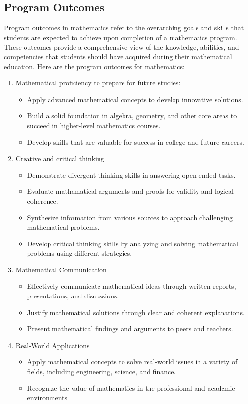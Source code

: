 \subsection{Program Outcomes}
Program outcomes in mathematics refer to the overarching goals and skills that students are expected to achieve upon completion of a mathematics program. These outcomes provide a comprehensive view of the knowledge, abilities, and competencies that students should have acquired during their mathematical education. Here are the program outcomes for mathematics: 
\begin{enumerate}[label=\Alph*.]
	\item{Mathematical proficiency to prepare for future studies:}
	\begin{itemize}
		\item Apply advanced mathematical concepts to develop innovative solutions.
		\item Build a solid foundation in algebra, geometry, and other core areas to succeed in higher-level mathematics courses.
		\item Develop skills that are valuable for success in college and future careers.
	\end{itemize}
	\item{Creative and critical thinking}
	\begin{itemize}
		\item Demonstrate divergent thinking skills in answering open-ended tasks. 
		\item Evaluate mathematical arguments and proofs for validity and logical coherence.
		\item Synthesize information from various sources to approach challenging mathematical problems.
		\item Develop critical thinking skills by analyzing and solving mathematical problems using different strategies.
	\end{itemize}
	\item{Mathematical Communication}
	\begin{itemize}
		\item Effectively communicate mathematical ideas through written reports, presentations, and discussions.
		\item Justify mathematical solutions through clear and coherent explanations.
		\item Present mathematical findings and arguments to peers and teachers.
	\end{itemize}
	\item{Real-World Applications}
	\begin{itemize}
		\item Apply mathematical concepts to solve real-world issues in a variety of fields, including engineering, science, and finance.
		\item Recognize the value of mathematics in the professional and academic environments
	\end{itemize}
\end{enumerate}

